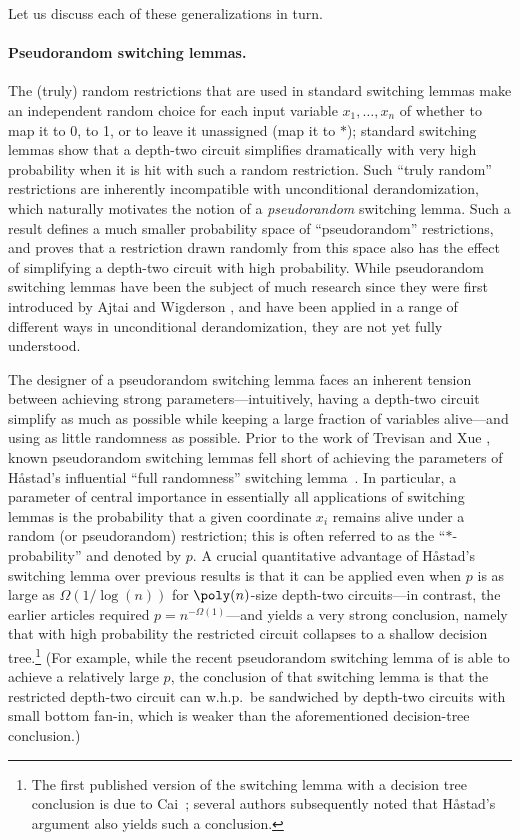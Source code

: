 \documentclass[11pt]{article}
\numberwithin{equation}{section}
\theoremstyle{definition}
\theoremstyle{plain}
\theoremstyle{plain}
\begin{document}
Let us discuss each of these generalizations in turn.


\vspace{-5pt}
\paragraph{Pseudorandom switching lemmas.}  The (truly) random 
restrictions that are used in standard switching lemmas make 
%
%
%
%
%
an independent  %
random choice for each input variable $x_1,\dots,x_n$ of whether to map it to 0, to 1, or to leave it unassigned (map it to $\ast$); standard switching lemmas show that a depth-two circuit simplifies dramatically with very high probability when it is hit with such a random restriction.  Such ``truly random'' restrictions are inherently incompatible with unconditional derandomization, which naturally motivates the notion of a \emph{pseudorandom} switching lemma.  Such a result defines a much smaller probability space of ``pseudorandom'' restrictions, and proves that a restriction drawn randomly from this space also has the effect of simplifying a depth-two circuit with high probability.   While pseudorandom switching lemmas have been the subject of much research since they were first introduced by Ajtai and Wigderson \cite{AjtaiWigderson:85,Ajt93,CR96,AAIPR01,GMRTV12,IMP12,GMR13,TX13,GW14}, and have been applied in a range of different ways in unconditional derandomization, they are not yet fully understood.

The designer of a pseudorandom switching lemma faces an inherent tension between achieving strong parameters---intuitively, having a depth-two circuit simplify as much as possible while keeping a large fraction of variables alive---and using as little randomness as possible.  Prior to the work of Trevisan and Xue \cite{TX13}, known pseudorandom switching lemmas fell short of achieving the parameters of H{\aa}stad's influential ``full randomness'' switching lemma~\cite{Hastad86}.  In particular, a parameter of central importance in essentially all applications of switching lemmas is the probability that a given coordinate $x_i$ remains alive under a random (or pseudorandom) restriction; this is often referred to as the ``$\ast$-probability'' and denoted by $p$.  
A crucial quantitative advantage of H{\aa}stad's switching lemma over previous
%
results %
is that it can be applied even when $p$ is as large as $\Omega(1/\log(n))$ for $\poly(n)$-size depth-two circuits---in contrast, the earlier 
%
articles %
\cite{ajtai1983,FSS:84,yao1985} required $p=n^{-\Omega(1)}$---and yields a very strong conclusion, namely that with high probability the restricted circuit collapses to a shallow decision tree.\footnote{The first published version of the switching lemma with a decision tree conclusion is due to Cai~\cite{Cai86}; several authors subsequently noted that H{\aa}stad's argument also yields such a conclusion.} %
(For example, while the recent pseudorandom switching lemma of \cite{GMR13} is able to achieve a relatively large $p$, the conclusion of that switching lemma is that the restricted depth-two circuit can w.h.p.~be sandwiched by depth-two circuits with small bottom fan-in, which is weaker than the aforementioned %
decision-tree conclusion.)  %
\end{document}
